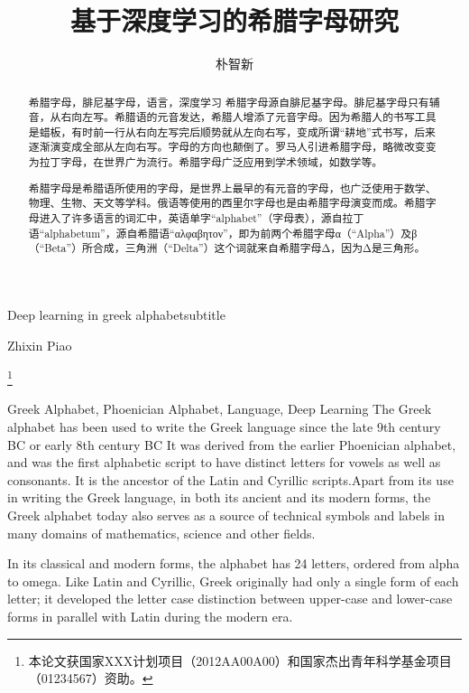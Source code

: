 \documentclass[bachelor,nocolorlinks, printoneside]{seuthesis} %
\begin{document}

\title{基于深度学习的希腊字母研究}{}{Deep learning in greek alphabet}{subtitle}
\author{朴智新}{Zhixin Piao}

\address{河海院2楼}
\thanks{本论文获国家XXX计划项目（2012AA00A00）和国家杰出青年科学基金项目（01234567）资助。}
\maketitle

\begin{abstract}{希腊字母，腓尼基字母，语言，深度学习}
希腊字母源自腓尼基字母。腓尼基字母只有辅音，从右向左写。希腊语的元音发达，希腊人增添了元音字母。因为希腊人的书写工具是蜡板，有时前一行从右向左写完后顺势就从左向右写，变成所谓“耕地”式书写，后来逐渐演变成全部从左向右写。字母的方向也颠倒了。罗马人引进希腊字母，略微改变变为拉丁字母，在世界广为流行。希腊字母广泛应用到学术领域，如数学等。

希腊字母是希腊语所使用的字母，是世界上最早的有元音的字母，也广泛使用于数学、物理、生物、天文等学科。俄语等使用的西里尔字母也是由希腊字母演变而成。希腊字母进入了许多语言的词汇中，英语单字“alphabet”（字母表），源自拉丁语“alphabetum”，源自希腊语“αλφαβητον”，即为前两个希腊字母α（“Alpha”）及β（“Beta”）所合成，三角洲（“Delta”）这个词就来自希腊字母Δ，因为Δ是三角形。
\end{abstract}

\begin{englishabstract}{Greek Alphabet, Phoenician Alphabet, Language, Deep Learning}
The Greek alphabet has been used to write the Greek language since the late 9th century BC or early 8th century BC It was derived from the earlier Phoenician alphabet, and was the first alphabetic script to have distinct letters for vowels as well as consonants. It is the ancestor of the Latin and Cyrillic scripts.Apart from its use in writing the Greek language, in both its ancient and its modern forms, the Greek alphabet today also serves as a source of technical symbols and labels in many domains of mathematics, science and other fields.

In its classical and modern forms, the alphabet has 24 letters, ordered from alpha to omega. Like Latin and Cyrillic, Greek originally had only a single form of each letter; it developed the letter case distinction between upper-case and lower-case forms in parallel with Latin during the modern era.
\end{englishabstract}
\end{document}
